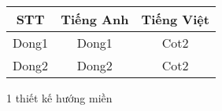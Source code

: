 



















\begin{table}[h]

\centering

\begin{tabular}{|c|c|c|}

\hline

STT & Tiếng Anh & Tiếng Việt \\

\hline

Dong1 & Dong1 & Cot2 \\

\hline

Dong2 & Dong2 & Cot2 \\

\hline

\end{tabular}

\end{table}









1 thiết kế hướng miền

